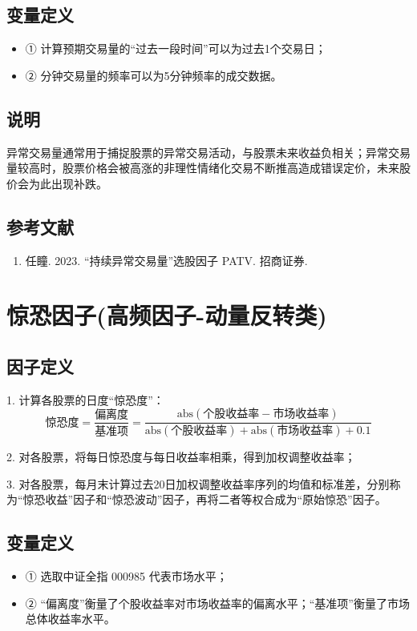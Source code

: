 \documentclass{article}
\begin{document}
\subsection{变量定义}
\begin{itemize}
    \item ① 计算预期交易量的“过去一段时间”可以为过去1个交易日；
    \item ② 分钟交易量的频率可以为5分钟频率的成交数据。
\end{itemize}

\subsection{说明}
异常交易量通常用于捕捉股票的异常交易活动，与股票未来收益负相关；异常交易量较高时，股票价格会被高涨的非理性情绪化交易不断推高造成错误定价，未来股价会为此出现补跌。

\subsection{参考文献}
\begin{enumerate}
    \item 任瞳. 2023. “持续异常交易量”选股因子 PATV. 招商证券.
\end{enumerate}

\section{惊恐因子(高频因子-动量反转类)}

\subsection{因子定义}

1. 计算各股票的日度“惊恐度”：
\begin{equation}
    \text{惊恐度} = \frac{\text{偏离度}}{\text{基准项}} = \frac{\mathrm{abs}(\text{个股收益率} - \text{市场收益率})}{\mathrm{abs}(\text{个股收益率}) + \mathrm{abs}(\text{市场收益率}) + 0.1}
\end{equation}

2. 对各股票，将每日惊恐度与每日收益率相乘，得到加权调整收益率；

3. 对各股票，每月末计算过去20日加权调整收益率序列的均值和标准差，分别称为“惊恐收益”因子和“惊恐波动”因子，再将二者等权合成为“原始惊恐”因子。

\subsection{变量定义}
\begin{itemize}
    \item ① 选取中证全指 000985 代表市场水平；
    \item ② “偏离度”衡量了个股收益率对市场收益率的偏离水平；“基准项”衡量了市场总体收益率水平。
\end{itemize}
\end{document}
